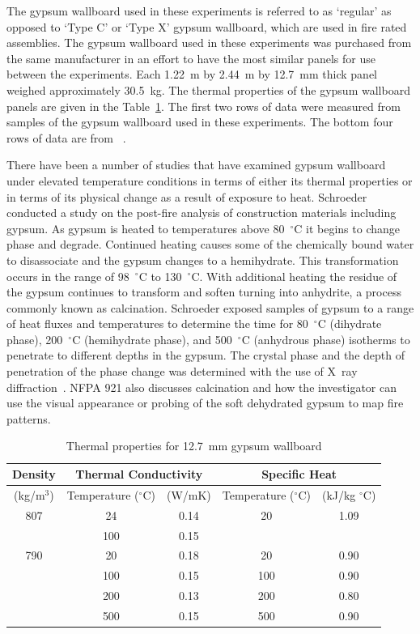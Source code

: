 \documentclass[twoside]{uocthesis}
\begin{document}
{The gypsum wallboard used in these experiments is referred to as `regular' as opposed to `Type C' or `Type X' gypsum wallboard, which are used in fire rated assemblies. The gypsum wallboard used in these experiments was purchased from the same manufacturer in an effort to have the most similar panels for use between the experiments. Each 1.22~m by 2.44~m by 12.7~mm thick panel weighed approximately 30.5~kg.  The thermal properties of the gypsum wallboard panels are given in the Table~\ref{tab:Gypsum wallboard_Thermal_Properties}.  The first two rows of data were measured from samples of the gypsum wallboard used in these experiments.  The bottom four rows of data are from ~\cite{Gross:1985}.

There have been a number of studies that have examined gypsum wallboard under elevated temperature conditions in terms of either its thermal properties or in terms of its physical change as a result of exposure to heat.  Schroeder conducted a study on the post-fire analysis of construction materials including gypsum.  As gypsum is heated to temperatures above 80~$^\circ$C it begins to change phase and degrade.  Continued heating causes some of the chemically bound water to disassociate and the gypsum changes to a hemihydrate.  This transformation occurs in the range of 98~$^\circ$C to 130~$^\circ$C. With additional heating the residue of the gypsum continues to transform and soften turning into anhydrite, a process commonly known as calcination.  Schroeder exposed samples of gypsum to a range of heat fluxes and temperatures to determine the time for 80~$^\circ$C (dihydrate phase), 200~$^\circ$C (hemihydrate phase), and 500~$^\circ$C (anhydrous phase) isotherms to penetrate to different depths in the gypsum.  The crystal phase and the depth of penetration of the phase change was determined with the use of X~\-ray diffraction~\cite{Schroeder:1999}.  NFPA 921 also discusses calcination and how the investigator can use the visual appearance or probing of the soft dehydrated gypsum to map fire patterns.

\begin{table}
	\centering
	\begin{tabular}{|c|c|c|c|c|}
		\hline Density & \multicolumn{2}{c|}{Thermal Conductivity}   & \multicolumn{2}{c|}{Specific Heat}  \\
		\hline (kg/m$^3$) & Temperature ($^{\circ}$C) & (W/mK)  & Temperature ($^{\circ}$C)  & (kJ/kg $^{\circ}$C) \\ 
		\hline 807  & 24 	& 0.14 	& 20	& 1.09 \\
		\hline  	& 100 	& 0.15  &  		&  \\
		\hline 790 	& 20 	& 0.18	& 20 	& 0.90 \\
		\hline  	& 100 	& 0.15 	& 100 	& 0.90 \\
		\hline  	& 200 	& 0.13 	& 200 	& 0.80 \\
		\hline  	& 500 	& 0.15 	& 500	& 0.90 \\
		\hline
		\end{tabular}
		\caption[Thermal properties for 12.7~mm gypsum wallboard]{Thermal properties for 12.7~mm gypsum wallboard}
		\label{tab:Gypsum wallboard_Thermal_Properties}
		\end{table}


}
\end{document}

